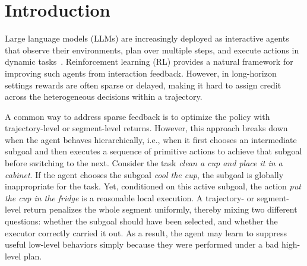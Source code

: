 \documentclass{article}
\newcommand{\wei}[1]{\textcolor{red}{#1}}
\begin{document}
\section{Introduction}

Large language models (LLMs) are increasingly deployed as interactive agents that observe their environments, plan over multiple steps, and execute actions in dynamic tasks~\cite{yao2022react,shinn2023reflexion,wang2024voyager}. Reinforcement learning (RL) provides a natural framework for improving such agents from interaction feedback. However, in long-horizon settings rewards are often sparse or delayed, making it hard to assign credit across the heterogeneous decisions within a trajectory.


A common way to address sparse feedback is to optimize the policy with trajectory-level or segment-level returns. However, this approach breaks down when the agent behaves hierarchically, i.e., when it first chooses an intermediate subgoal and then executes a sequence of primitive actions to achieve that subgoal before switching to the next. Consider the task \emph{clean a cup and place it in a cabinet}. If the agent chooses the subgoal \emph{cool the cup}, the subgoal is globally inappropriate for the task. Yet, conditioned on this active subgoal, the action \emph{put the cup in the fridge} is a reasonable local execution. A trajectory- or segment-level return penalizes the whole segment uniformly, thereby mixing two different questions: whether the subgoal should have been selected, and whether the executor correctly carried it out. As a result, the agent may learn to suppress useful low-level behaviors simply because they were performed under a bad high-level plan.


\end{document}
